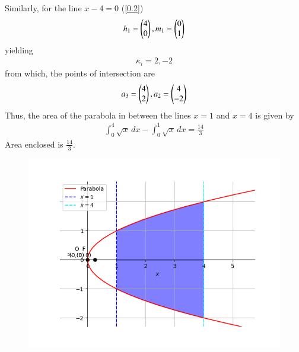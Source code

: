 \documentclass[journal]{IEEEtran}
\begin{document}
Similarly, for the line $x-4=0$ (\ref{0.2})\\
\begin{align}
   h_1=\begin{pmatrix}4\\0\end{pmatrix} , m_1=\begin{pmatrix}0\\1\end{pmatrix}
\end{align}
yielding\\
\begin{align}
    \kappa_i= 2,-2
\end{align}
from which, the points of intersection are\\
\begin{align}
      a_3=\begin{pmatrix}4\\2\end{pmatrix},a_2=\begin{pmatrix}4\\-2\end{pmatrix}
\end{align}
Thus, the area of the parabola in between the lines $x=1$ and $x=4$ is given by \\
\begin{align}
    \int_{0}^{4} \sqrt{x} \, dx - \int_{0}^{1} \sqrt{x} \, dx = \frac{14}{3}
\end{align}
Area enclosed is $\frac{14}{3}$.
\begin{figure}[h!]
   \centering
   \includegraphics[width=\linewidth]{figs/Figure_1.png}
   \caption{}
   \label{stemplot}
\end{figure}
\end{document}
